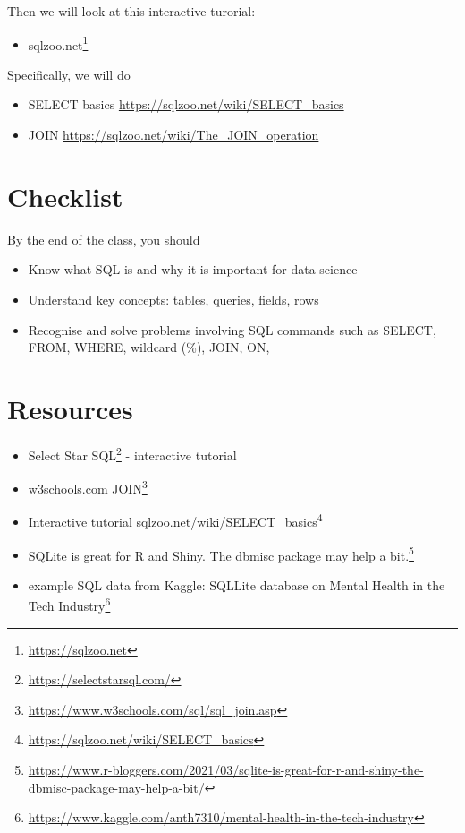 \documentclass[
  12pt,
  a5paper,
]{book}
\DeclareRobustCommand{\href}[2]{#2\footnote{\url{#1}}}
\providecommand{\tightlist}{%
  \setlength{\itemsep}{0pt}\setlength{\parskip}{0pt}}
\begin{document}
Then we will look at this interactive turorial:

\begin{itemize}
\tightlist
\item
  \href{https://sqlzoo.net}{sqlzoo.net}
\end{itemize}

Specifically, we will do

\begin{itemize}
\tightlist
\item
  SELECT basics \url{https://sqlzoo.net/wiki/SELECT_basics}
\item
  JOIN \url{https://sqlzoo.net/wiki/The_JOIN_operation}
\end{itemize}

\hypertarget{checklist-9}{%
\section{Checklist}\label{checklist-9}}

By the end of the class, you should

\begin{itemize}
\tightlist
\item
  Know what SQL is and why it is important for data science
\item
  Understand key concepts: tables, queries, fields, rows
\item
  Recognise and solve problems involving SQL commands such as SELECT, FROM, WHERE, wildcard (\%), JOIN, ON,
\end{itemize}

\hypertarget{resources-11}{%
\section{Resources}\label{resources-11}}

\begin{itemize}
\tightlist
\item
  \href{https://selectstarsql.com/}{Select Star SQL} - interactive tutorial
\item
  w3schools.com \href{https://www.w3schools.com/sql/sql_join.asp}{JOIN}
\item
  Interactive tutorial \href{https://sqlzoo.net/wiki/SELECT_basics}{sqlzoo.net/wiki/SELECT\_basics}
\item
  \href{https://www.r-bloggers.com/2021/03/sqlite-is-great-for-r-and-shiny-the-dbmisc-package-may-help-a-bit/}{SQLite is great for R and Shiny. The dbmisc package may help a bit.}
\item
  example SQL data from Kaggle: SQLLite database on \href{https://www.kaggle.com/anth7310/mental-health-in-the-tech-industry}{Mental Health in the Tech Industry}
\end{itemize}
\end{document}
